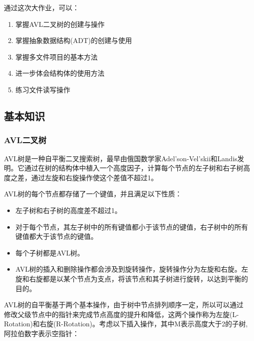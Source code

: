 \documentclass[12pt, a4paper, oneside]{ctexart}
\begin{document}
通过这次大作业，可以：
\begin{enumerate}
    \item 掌握AVL二叉树的创建与操作
    \item 掌握抽象数据结构(ADT)的创建与使用
    \item 掌握多文件项目的基本方法
    \item 进一步体会结构体的使用方法
    \item 练习文件读写操作
\end{enumerate}

\subsection{基本知识}
\subsubsection{AVL二叉树}
AVL树是一种自平衡二叉搜索树，最早由俄国数学家Adel'son-Vel'skii和Landis发明。它通过在树的结构体中植入一个高度因子，计算每个节点的左子树和右子树高度之差，通过左旋和右旋操作使这个差值不超过1。

AVL树的每个节点都存储了一个键值，并且满足以下性质：

\begin{itemize}
    \item 左子树和右子树的高度差不超过1。
    \item 对于每个节点，其左子树中的所有键值都小于该节点的键值，右子树中的所有键值都大于该节点的键值。
    \item 每个子树都是AVL树。
    \item AVL树的插入和删除操作都会涉及到旋转操作，旋转操作分为左旋和右旋。左旋和右旋都是以某个节点为支点，将该节点和其子树进行旋转，以达到平衡的目的。
\end{itemize}

AVL树的自平衡基于两个基本操作，由于树中节点排列顺序一定，所以可以通过修改父级节点中的指针来完成节点高度的提升和降低，这两个操作称为左旋(L-Rotation)和右旋(R-Rotation)。考虑以下插入操作，其中M表示高度大于2的子树,阿拉伯数字表示空指针：
\end{document}
